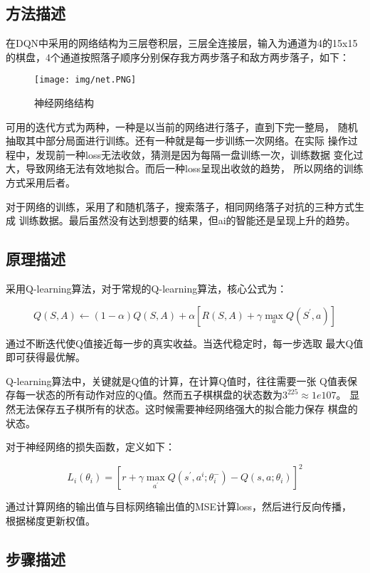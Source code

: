 \documentclass[UTF8]{article}
\begin{document}
\subsection{方法描述}

在DQN中采用的网络结构为三层卷积层，三层全连接层，输入为通道为4的15x15
的棋盘，4个通道按照落子顺序分别保存我方两步落子和敌方两步落子，如下：
\nopagebreak

\begin{figure}[H]
    \centering
    \texttt{[image: img/net.PNG]}
    \caption{神经网络结构}
\end{figure}

可用的迭代方式为两种，一种是以当前的网络进行落子，直到下完一整局，
随机抽取其中部分局面进行训练。还有一种就是每一步训练一次网络。在实际
操作过程中，发现前一种loss无法收敛，猜测是因为每隔一盘训练一次，训练数据
变化过大，导致网络无法有效地拟合。而后一种loss呈现出收敛的趋势，
所以网络的训练方式采用后者。

对于网络的训练，采用了和随机落子，搜索落子，相同网络落子对抗的三种方式生成
训练数据。最后虽然没有达到想要的结果，但ai的智能还是呈现上升的趋势。

\subsection{原理描述}

采用Q-learning算法，对于常规的Q-learning算法，核心公式为：

$$Q(S,A)\leftarrow (1-\alpha)Q(S,A)+\alpha[R(S,A)+\gamma \max\limits_{a}Q(S^{'},a)]$$

通过不断迭代使Q值接近每一步的真实收益。当迭代稳定时，每一步选取
最大Q值即可获得最优解。

Q-learning算法中，关键就是Q值的计算，在计算Q值时，往往需要一张
Q值表保存每一状态的所有动作对应的Q值。然而五子棋棋盘的状态数为$3^{225}\approx 1e107$。
显然无法保存五子棋所有的状态。这时候需要神经网络强大的拟合能力保存
棋盘的状态。

对于神经网络的损失函数，定义如下：

$$L_i(\theta_i)=[r+\gamma\max\limits_{a^{'}}Q(s^{'},a^i;\theta^{-}_i)-Q(s,a;\theta_i)]^2$$

通过计算网络的输出值与目标网络输出值的MSE计算loss，然后进行反向传播，
根据梯度更新权值。

\subsection{步骤描述}
\end{document}
